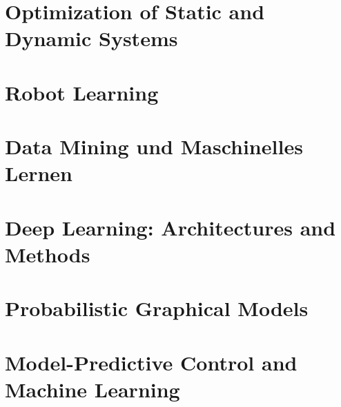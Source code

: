 \documentclass[english, notodo]{fdsummary}
\subtitle{Master of Science}
\newcommand{\lstbasepath}{unset}
\begin{document}
	\maketitle
	\tableofcontents

	\cleardoublepage
	\part{Optimization of Static and Dynamic Systems}
	\graphicspath{{./cs/cs/elective/ce/opt/}}
	\renewcommand{\lstbasepath}{./cs/elective/ce/opt}
	
	
	\cleardoublepage
	\part{Robot Learning}
	\graphicspath{{./cs/elective/ce/role/}}
	\renewcommand{\lstbasepath}{./cs/elective/ce/role}
	
	
	\cleardoublepage
	\part{Data Mining und Maschinelles Lernen}
	\graphicspath{{./cs/elective/iws/dmml/}}
	\renewcommand{\lstbasepath}{./cs/elective/iws/dmml}
	
	
	\cleardoublepage
	\part{Deep Learning: Architectures and Methods}
	\graphicspath{{./cs/elective/iws/dlam/}}
	\renewcommand{\lstbasepath}{./cs/elective/iws/dlam}
	
	
	\cleardoublepage
	\part{Probabilistic Graphical Models}
	\graphicspath{{./cs/elective/vc/pgm/}}
	\renewcommand{\lstbasepath}{./cs/elective/vc/pgm}
	
	
	\cleardoublepage
	\part{Model-Predictive Control and Machine Learning}
	\graphicspath{{./other/eeit/ccps/mpc/}}
	\renewcommand{\lstbasepath}{./other/eeit/ccps/mpc}
	
	
\end{document}
